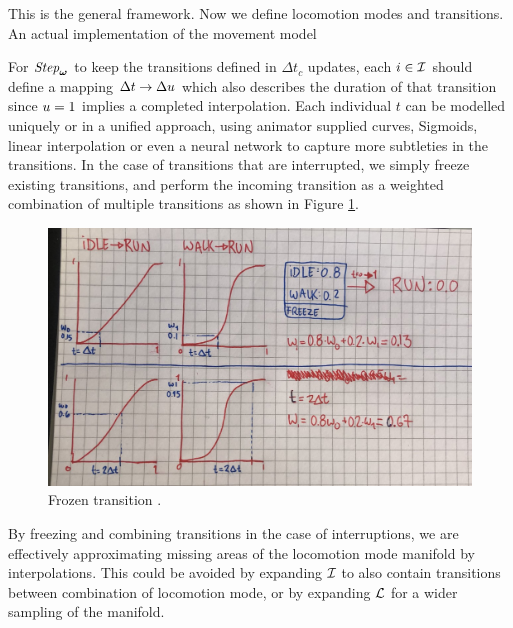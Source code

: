 This is the general framework. Now we define locomotion modes and transitions. An actual implementation of the movement model

For $\textit{Step}_{\boldsymbol{\omega }}$ to keep the transitions defined in $\Delta{t}_c$ updates, each $i\in\mathcal{I}$ should define a mapping $\Delta{t} \rightarrow \Delta u$ which also describes the duration of that transition since $u=1$ implies a completed interpolation. Each individual $t$ can be modelled uniquely or in a unified approach, using animator supplied curves, Sigmoids, linear interpolation or even a neural network to capture more subtleties in the transitions. In the case of transitions that are interrupted, we simply freeze existing transitions, and perform the incoming transition as a weighted combination of multiple transitions as shown in Figure \ref{fig:frozen-transition}. 
\begin{figure}
    \centering
    \includegraphics[width=0.75\columnwidth]{img/frozen-transitions}
    \caption{Frozen transition .}
  \label{fig:frozen-transition}
\end{figure}

By freezing and combining transitions in the case of interruptions, we are effectively approximating missing areas of the locomotion mode manifold by interpolations. This could be avoided by expanding $\mathcal{I}$ to also contain transitions between combination of locomotion mode, or by expanding $\mathcal{L}$ for a wider sampling of the manifold.

